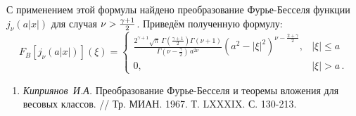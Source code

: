 С применением этой формулы найдено преобразование Фурье-Бесселя функции $j_\nu(a|x|)$ для случая $\nu>{\gamma+1\over2}$.
Приведём полученную формулу:
$$
	F_B[j_\nu(a|x|)](\xi)=\!
	\begin{cases}
		\!\frac{2^{\gamma+1}\sqrt{\pi}\,\Gamma(\frac{\gamma+1}{2})\Gamma\left(\nu+1\right)}{\Gamma\left(\nu-\frac{\gamma}{2}\right)\,a^{2\nu}}(a^2-|\xi|^2)^{{\nu-\frac{2+\gamma}{2}}}, &\!  |\xi|\leqslant a \\
		\!0 , &\! |\xi|> a\,.
	\end{cases}
$$

%
%


%
%
%
%


\litlist

\begin{enumerate}
\item {\it Киприянов~И.А.}{ Преобразование Фурье-Бесселя и теоремы вложения для весовых классов. /\!/ Тр. МИАН. 1967. Т. LXXXIX. С. 130-213.}
\end{enumerate}
